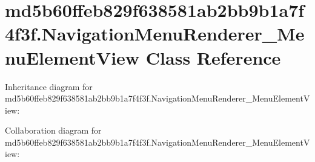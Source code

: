 \hypertarget{classmd5b60ffeb829f638581ab2bb9b1a7f4f3f_1_1_navigation_menu_renderer___menu_element_view}{}\section{md5b60ffeb829f638581ab2bb9b1a7f4f3f.\+Navigation\+Menu\+Renderer\+\_\+\+Menu\+Element\+View Class Reference}
\label{classmd5b60ffeb829f638581ab2bb9b1a7f4f3f_1_1_navigation_menu_renderer___menu_element_view}


Inheritance diagram for md5b60ffeb829f638581ab2bb9b1a7f4f3f.\+Navigation\+Menu\+Renderer\+\_\+\+Menu\+Element\+View\+:


Collaboration diagram for md5b60ffeb829f638581ab2bb9b1a7f4f3f.\+Navigation\+Menu\+Renderer\+\_\+\+Menu\+Element\+View\+:
